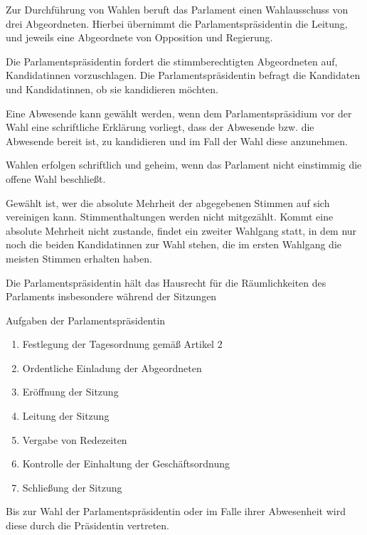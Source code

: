 \documentclass{sasbase}
\begin{document}
\begin{article}[Wahl]
\item Zur Durchführung von Wahlen beruft das Parlament einen Wahlausschuss von drei Abgeordneten. Hierbei \"{u}bernimmt die Parlamentspr\"{a}sidentin die Leitung, und jeweils eine Abgeordnete von Opposition und Regierung.
\item Die Parlamentspr\"{a}sidentin fordert die stimmberechtigten Abgeordneten auf, Kandidatinnen vorzuschlagen. Die Parlamentspr\"{a}sidentin befragt die Kandidaten und Kandidatinnen, ob sie kandidieren möchten.
\item Eine Abwesende kann gewählt werden, wenn dem Parlamentspr\"{a}sidium vor der Wahl eine schriftliche Erklärung vorliegt, dass der Abwesende bzw. die Abwesende bereit ist, zu kandidieren und im Fall der Wahl diese anzunehmen.
\item Wahlen erfolgen schriftlich und geheim, wenn das Parlament nicht einstimmig die offene Wahl beschließt.
\item Gewählt ist, wer die absolute Mehrheit der abgegebenen Stimmen auf sich vereinigen kann. Stimmenthaltungen werden nicht mitgezählt. Kommt eine absolute Mehrheit nicht zustande, findet ein zweiter Wahlgang statt, in dem nur noch die beiden Kandidatinnen zur Wahl stehen, die im ersten Wahlgang die meisten Stimmen erhalten haben.
\end{article}
\begin{article}[Parlamentspräsidentin]
    \item Die Parlamentspräsidentin hält das Hausrecht für die Räumlichkeiten des Parlaments
        insbesondere während der Sitzungen
    \item Aufgaben der Parlamentspräsidentin
    \begin{enumerate}
        \item Festlegung der Tagesordnung gemäß Artikel 2
        \item Ordentliche Einladung der Abgeordneten
        \item Eröffnung der Sitzung
        \item Leitung der Sitzung
        \item Vergabe von Redezeiten
        \item Kontrolle der Einhaltung der Geschäftsordnung
        \item Schließung der Sitzung
    \end{enumerate}
    \item Bis zur Wahl der Parlamentspräsidentin oder im Falle ihrer Abwesenheit wird diese durch
        die Präsidentin vertreten.
\end{article}
\end{document}
